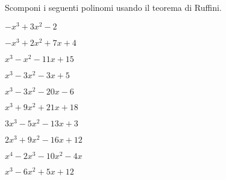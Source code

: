 \begin{esercizio}\label{ese:}
Scomponi i seguenti polinomi usando il teorema di Ruffini.
\begin{enumeratea}
\item \(- x^{3} + 3 x^{2} - 2\)
\item \(- x^{3} + 2 x^{2} + 7 x + 4\)
\item \(x^{3} - x^{2} - 11 x + 15\)
\item \(x^{3} - 3 x^{2} - 3 x + 5\)
\item \(x^{3} - 3 x^{2} - 20 x - 6\)
\item \(x^{3} + 9 x^{2} + 21 x + 18\)
\item \(3 x^{3} - 5 x^{2} - 13 x + 3\)
\item \(2 x^{3} + 9 x^{2} - 16 x + 12\)
\item \(x^{4} - 2 x^{3} - 10 x^{2} - 4 x\)
\item \(x^{3} - 6 x^{2} + 5 x + 12\)

\end{enumeratea}
\end{esercizio}
